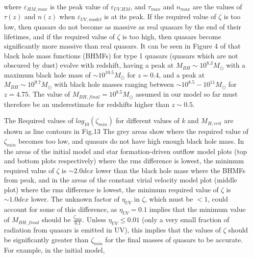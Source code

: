 \documentclass[12pt, twocolumn]{report}%
\begin{document}
\noindent where $\varepsilon_{HM,max}$ is the peak value of $\varepsilon_{UV.HM}$, and $\tau_{max}$ and $n_{max}$ are the values of $\tau(z)$ and $n(z)$ when $\varepsilon_{UV,model}$ is at its peak. If the required value of $\zeta$ is too low, then quasars do not become as massive as real quasars by the end of their lifetimes, and if the required value of $\zeta$ is too high, then quasars become significantly more massive than real quasars. It can be seen in Figure 4 of \cite{BH_mass_fns} that black hole mass functions (BHMFs) for type 1 quasars (quasars which are not obscured by dust) evolve with redshift, having a peak at $M_{BH}\sim10^{8.3}M_\odot$ with a maximum black hole mass of $\sim10^{10.5}M_\odot$ for $z=0.4$, and a peak at $M_{BH}\sim10^{9.7}M_\odot$ with black hole masses ranging between $\sim10^{8.5}-10^{11}M_\odot$ for $z=4.75$. The value of $M_{BH,final}=10^{8.5}M_\odot$ assumed in our model so far must therefore be an underestimate for redshifts higher than $z\sim0.5$.\par

The Required values of $log_{10}(\zeta_{min})$ for different values of $k$ and $M_{H,crit}$ are shown as line contours in Fig.13 The grey areas show where the required value of $\zeta_{min}$ becomes too low, and quasars do not have high enough black hole mass. In the areas of the initial model and star formation-driven outflow model plots (top and bottom plots respectively) where the rms difference is lowest, the minimum required value of $\zeta$ is $\sim2.0dex$ lower than the black hole mass where the BHMFs from \citeauthor{BH_mass_fns} peak, and in the areas of the constant virial velocity model plot (middle plot) where the rms difference is lowest, the minimum required value of $\zeta$ is $\sim1.0dex$ lower. The unknown factor of $\eta_{UV}$ in $\zeta$, which must be $<1$, could account for some of this difference, as $\eta_{UV}=0.1$ implies that the minimum value of $M_{BH,final}$ should be $\frac{\zeta_{min}}{0.1}$. Unless $\eta_{UV}\leq0.01$ (only a very small fraction of radiation from quasars is emitted in UV), this implies that the values of $\zeta$ should be significantly greater than $\zeta_{min}$ for the final masses of quasars to be accurate. For example, in the initial model,

\onecolumngrid
\end{document}
